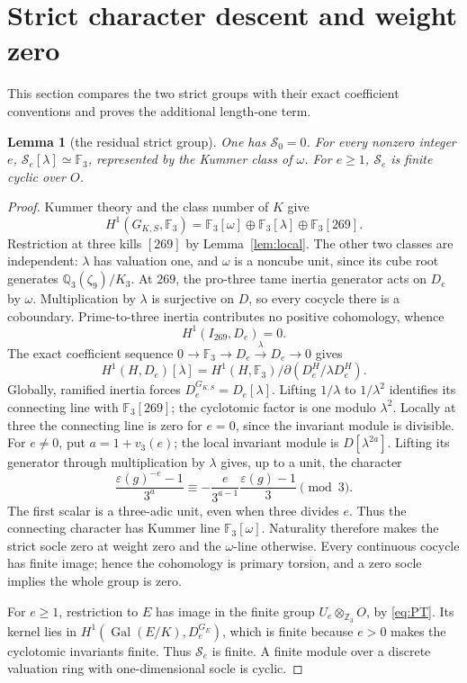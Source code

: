 \documentclass[11pt]{article}
\newtheorem{lemma}[theorem]{Lemma}
\theoremstyle{remark}\newtheorem{remark}[theorem]{Remark}
\newcommand{\Z}{\mathbb Z}\newcommand{\Q}{\mathbb Q}\newcommand{\F}{\mathbb F}
\newcommand{\Gal}{\operatorname{Gal}}\newcommand{\len}{\operatorname{length}}
\begin{document}
\section{Strict character descent and weight zero}
This section compares the two strict groups with their exact coefficient conventions and proves the additional length-one term.
\begin{lemma}[the residual strict group]
\label{lem:residual}
One has $\mathcal S_0=0$.
For every nonzero integer $e$, $\mathcal S_e[\lambda]\simeq\F_3$, represented by the Kummer class of $\omega$.
For $e\geq1$, $\mathcal S_e$ is finite cyclic over $O$.
\end{lemma}
\begin{proof}
Kummer theory and the class number of $K$ give
\[
 H^1(G_{K,S},\F_3)=\F_3[\omega]\oplus\F_3[\lambda]\oplus\F_3[269].
\]
Restriction at three kills $[269]$ by Lemma~\ref{lem:local}.
The other two classes are independent: $\lambda$ has valuation one, and $\omega$ is a noncube unit, since its cube root generates $\Q_3(\zeta_9)/K_3$.
At $269$, the pro-three tame inertia generator acts on $D_e$ by $\omega$.
Multiplication by $\lambda$ is surjective on $D$, so every cocycle there is a coboundary.
Prime-to-three inertia contributes no positive cohomology, whence
\begin{equation}H^1(I_{269},D_e)=0.\label{eq:inertia}
\end{equation}
The exact coefficient sequence $0\to\F_3\to D_e\xrightarrow{\lambda}D_e\to0$ gives
\[
 H^1(H,D_e)[\lambda]=H^1(H,\F_3)/\partial(D_e^H/\lambda D_e^H).
\]
Globally, ramified inertia forces $D_e^{G_{K,S}}=D_e[\lambda]$.
Lifting $1/\lambda$ to $1/\lambda^2$ identifies its connecting line with $\F_3[269]$; the cyclotomic factor is one modulo $\lambda^2$.
Locally at three the connecting line is zero for $e=0$, since the invariant module is divisible.
For $e\ne0$, put $a=1+v_3(e)$; the local invariant module is $D[\lambda^{2a}]$.
Lifting its generator through multiplication by $\lambda$ gives, up to a unit, the character
\[
 \frac{\varepsilon(g)^{-e}-1}{3^a}
 \equiv-\frac{e}{3^{a-1}}\frac{\varepsilon(g)-1}{3}\pmod3.
\]
The first scalar is a three-adic unit, even when three divides $e$.
Thus the connecting character has Kummer line $\F_3[\omega]$.
Naturality therefore makes the strict socle zero at weight zero and the $\omega$-line otherwise.
Every continuous cocycle has finite image; hence the cohomology is primary torsion, and a zero socle implies the whole group is zero.

For $e\geq1$, restriction to $E$ has image in the finite group $U_e\otimes_{\Z_3}O$, by \eqref{eq:PT}.
Its kernel lies in $H^1(\Gal(E/K),D_e^{G_E})$, which is finite because $e>0$ makes the cyclotomic invariants finite.
Thus $\mathcal S_e$ is finite.
A finite module over a discrete valuation ring with one-dimensional socle is cyclic.
\end{proof}
\end{document}
